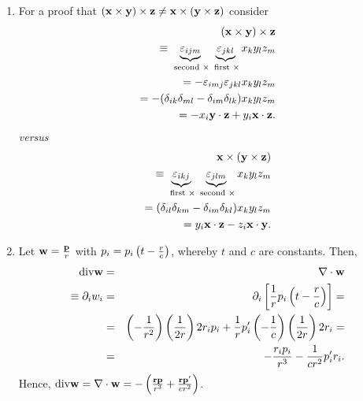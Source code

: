 {\begin{enumerate}
\item        For a proof that
$({{\bf x} } \times {{\bf y}})\times {{\bf z}}
\neq
{{\bf x} } \times ({{\bf y}}\times {{\bf z}})$ consider
\begin{equation}
\begin{split}
({{\bf x} } \times {{\bf y}})\times {{\bf z}}\\
\equiv
\underbrace{\varepsilon_{ijm}}_{\text{ second } \times}
\underbrace{\varepsilon_{jkl}}_{\text{ first } \times}
x_k y_l z_m\\=
-\varepsilon_{imj}
\varepsilon_{jkl}
x_k y_l z_m\\ =
-(\delta_{ik}\delta_{ml}-
\delta_{im}\delta_{lk})
x_k y_l z_m\\ =
-x_i {{\bf y}}\cdot {{\bf z}}+
y_i {{\bf x}}\cdot {{\bf z}}.
\end{split}
\end{equation}
{\it versus}
\begin{equation}
\begin{split}
{{\bf x} } \times ({{\bf y}}\times {{\bf z}})\\
\equiv
\underbrace{\varepsilon_{ikj}}_{\text{ first } \times}
\underbrace{\varepsilon_{jlm}}_{\text{ second } \times}
x_k y_l z_m\\ =
(\delta_{il}\delta_{km}-
\delta_{im}\delta_{kl})
x_k y_l z_m\\ =
y_i {{\bf x}}\cdot {{\bf z}}-
z_i {{\bf x}}\cdot {{\bf y}}.
\end{split}
\end{equation}





\item
Let ${\bf w} = { {{\bf p}} \over r} $ with  $p_i=p_i\left(t  - {r \over c}\right)$,
whereby   $t$ and $c$  are constants. Then,
\begin{eqnarray*}
  \mbox{div}{\bf w}& = &
\nabla \cdot {\bf w}\\
\equiv \partial_i w_i & = & \partial_i
  \left[
    \frac{1}{r} p_i \left(t-\frac{r}{c}\right)
  \right]= \\
  & = & \left(-\frac{1}{r^2}\right)\left(\frac{1}{2r}\right)
    2r_i p_i+
    \frac{1}{r}p_i'\left(-\frac{1}{c}\right)
    \left(\frac{1}{2r}\right)2 r_i= \\
  & = & -\frac{r_i p_i}{r^3}-\frac{1}{c r^2}p_i' r_i
.
\end{eqnarray*}
Hence,
$
  \mbox{div}{\bf w}=\nabla \cdot {\bf w}=
  -\left(\frac{{\bf r} {\bf p}}{r^3}+\frac{{\bf r} {\bf p}'}{c r^2}\right)
$.




\end{enumerate}}
